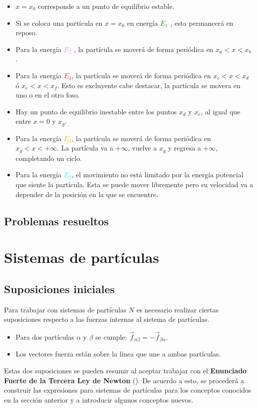 \documentclass[/home/hernan/Documentos/Apuntes_mecanica_teorica/main.tex]{subfiles}
\begin{document}
	\begin{itemize}
		\item $x = x_{0}$ corresponde a un punto de equilibrio estable.
		\item Si se coloca una partícula en $x = x_{0}$ en energía \textcolor{green}{$E_{1}$} , esta permancerá en reposo.
		\item Para la energía \textcolor{violet}{$E_{2}$} , la partícula se moverá de forma periódica en $x_{a} < x < x_{b}$.
		\item Para la energía \textcolor{red}{$E_{3}$}, la partícula se moverá de forma periódica en $x_{c} < x < x_{d}$ ó $x_{e} < x < x_{f}$. Esto es excluyente cabe destacar, la partícula se movera en uno o en el otro foso.
		\item Hay un punto de equilibrio inestable entre los puntos $x_{d}$ y $x_{e}$, al igual que entre $x = 0$ y $x_{g}$.
		\item Para la energía \textcolor{orange}{$E_{4}$}, la partícula se moverá de forma periódica en $x_{g} < x < +\infty $. La partícula va a $+\infty$, vuelve a $x_{g}$ y regresa a $+\infty$, completando un ciclo.
		\item Para la energía \textcolor{cyan}{$E_{5}$}, el movimiento no está limitado por la energía potencial que siente la partícula. Esta se puede mover libremente pero su velocidad va a depender de la posición en la que se encuentre.
	\end{itemize}


	\subsection{Problemas resueltos}

	
	

	\section{Sistemas de partículas}
	\label{sec: sisparticulas}

	\subsection{Suposiciones iniciales}

    Para trabajar con sistemas de partículas $N$ es necesario realizar ciertas suposiciones respecto a las fuerzas internas al sistema de partículas.

    \begin{itemize}
        \item Para dos partículas $\alpha$ y $\beta$ se cumple: $\vec{f}_{\alpha \beta} = - \vec{f}_{\beta \alpha}$.
        \item Los vectores fuerza están sobre la línea que une a ambas partículas.
    \end{itemize}
    Estas dos suposiciones se pueden resumir al aceptar trabajar con el \textbf{Enunciado Fuerte de la Tercera Ley de Newton}  (). De acuerdo a esto, se procederá a construir las expresiones para sistemas de partículas para los conceptos conocidos en la sección anterior y a introducir algunos conceptos nuevos.
\end{document}

